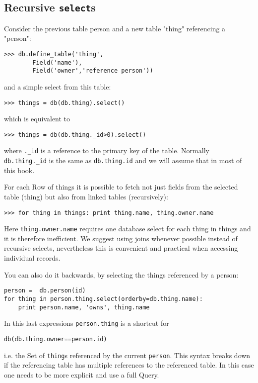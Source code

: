 \documentclass[justified,sixbynine,notoc]{tufte-book}
\def\ft{\small\tt}
\def\inxx#1{\index{#1}}
\begin{document}
\begin{fullwidth}
\goodbreak\subsection{Recursive {\ft select}s}

\inxx{recursive selects}

Consider the previous table person and a new table "thing" referencing a "person":
\begin{lstlisting}
>>> db.define_table('thing',
        Field('name'),
        Field('owner','reference person'))
\end{lstlisting}
\noindent and a simple select from this table:
\begin{lstlisting}
>>> things = db(db.thing).select()
\end{lstlisting}
\noindent which is equivalent to

\begin{lstlisting}
>>> things = db(db.thing._id>0).select()
\end{lstlisting}
\noindent where {\ft .\_id} is a reference to the primary key of the table. Normally {\ft db.thing.\_id} is the same as {\ft db.thing.id} and we will assume that in most of this book. \inxx{\_id}

For each Row of things it is possible to fetch not just fields from the selected table (thing) but also from linked tables (recursively):
\begin{lstlisting}
>>> for thing in things: print thing.name, thing.owner.name
\end{lstlisting}

Here {\ft thing.owner.name} requires one database select for each thing in things and it is therefore inefficient. We suggest using joins whenever possible instead of recursive selects, nevertheless this is convenient and practical when accessing individual records.

You can also do it backwards, by selecting the things referenced by a person:

\begin{lstlisting}
person =  db.person(id)
for thing in person.thing.select(orderby=db.thing.name):
    print person.name, 'owns', thing.name
\end{lstlisting}

In this last expressions {\ft person.thing} is a shortcut for

\begin{lstlisting}
db(db.thing.owner==person.id)
\end{lstlisting}
\noindent i.e. the Set of {\ft thing}s referenced by the current {\ft person}. This syntax breaks down if the referencing table has multiple references to the referenced table. In this case one needs to be more explicit and use a full Query.


\end{fullwidth}
\end{document}
